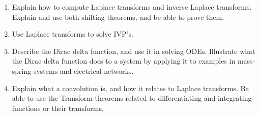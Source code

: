 
\begin{enumerate}

\item Explain how to compute Laplace transforms and inverse Laplace transforms. Explain and use both shifting theorems, and be able to prove them. 
\item Use Laplace transforms to solve IVP's.
\item Describe the Dirac delta function, and use it in solving ODEs. Illustrate what the Dirac delta function does to a system by applying it to examples in mass-spring systems and electrical networks.
\item Explain what a convolution is, and how it relates to Laplace transforms. Be able to use the Transform theorems related to differentiating and integrating functions or their transforms.

\end{enumerate}

